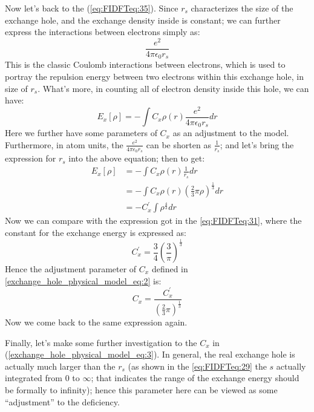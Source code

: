Now let's back to the (\ref{eq:FIDFTeq:35}). Since $r_{s}$
characterizes the size of the exchange hole, and the exchange density
inside is constant; we can further express the interactions between
electrons simply as:
\begin{equation}
  \label{exchange_hole_physical_model_eq:1}
  \frac{e^{2}}{4\pi\epsilon_{0}r_{s}}
\end{equation}
This is the classic Coulomb interactions between electrons, which is
used to portray the repulsion energy between two electrons within this
exchange hole, in size of $r_{s}$.
What's more, in counting all of electron density inside this hole, we
can have:
\begin{equation}
  \label{exchange_hole_physical_model_eq:2}
  E_{x}[\rho] = -\int C_{x}\rho(r)\frac{e^{2}}{4\pi\epsilon_{0}r_{s}} dr
\end{equation}
Here we further have some parameters of $C_{x}$ as an adjustment to
the model. Furthermore, in atom units, the $\frac{e^{2}}{4\pi
\epsilon_{0}r_{s}}$ can be shorten as $\frac{1}{r_{s}}$; and let's
bring the expression for $r_{s}$ into the above equation; then to get:
\begin{equation}
  \label{exchange_hole_physical_model_eq:3}
  \begin{split}
  E_{x}[\rho] &= -\int C_{x}\rho(r)\frac{1}{r_{s}} dr \\
&= -\int C_{x}\rho(r)\left(\frac{2}{3}\pi\rho\right)^{\frac{1}{3}} dr \\
&= -C_{x}^{'}\int\rho^{\frac{4}{3}} dr  
  \end{split}
\end{equation}
Now we can compare with the expression got in the \ref{eq:FIDFTeq:31},
where the constant for the exchange energy is expressed as:
\begin{equation}
  C_{x}^{'} = \frac{3}{4}\left(\frac{3}{\pi}\right)^{\frac{1}{3}} 
\end{equation}
Hence the adjustment parameter of $C_{x}$ defined in
\ref{exchange_hole_physical_model_eq:2} is:
\begin{equation}
  \label{exchange_hole_physical_model_eq:4}
  C_{x} = \frac{C_{x}^{'}}{(\frac{2}{3}\pi)^{\frac{1}{3}}}
\end{equation}
Now we come back to the same expression again. 

Finally, let's make some further investigation to the $C_{x}$ in
(\ref{exchange_hole_physical_model_eq:3}). In general, the real
exchange hole is actually much larger than the $r_{s}$ (as shown in
the \ref{eq:FIDFTeq:29} the $s$ actually integrated from $0$ to
$\infty$; that indicates the range of the exchange energy should be
formally to infinity); hence this parameter here can be viewed as some
``adjustment'' to the deficiency. 


